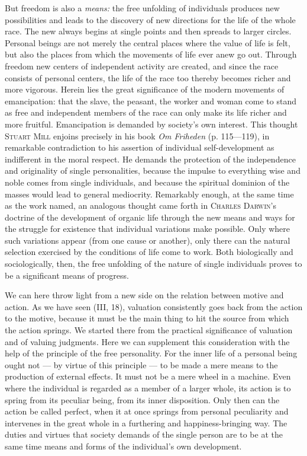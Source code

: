 \documentclass[12pt,a4paper,openany]{book}
\newcommand{\opage}[1]{\marginnote{\footnotesize\textit{[#1]}}}
\begin{document}
But freedom is also a \textit{means:} the free unfolding of individuals produces new possibilities and leads to
the discovery of new directions for the life of the whole race. The new always begins at single points and then
spreads to larger circles. Personal beings are not merely the central places where the value of life is felt,
but also the places from which the movements of life ever anew go out. Through freedom new centers of
independent activity are created, and since the race consists of personal centers, the life of the race too
thereby becomes richer and more vigorous. Herein lies the great significance of the modern movements of
emancipation: that the slave, the peasant, the worker and woman come to stand as free and independent members of
the race can only make its life richer and more fruitful. Emancipation is demanded by society's own interest.
This thought \textsc{Stuart Mill} enjoins precisely in his book \textit{Om Friheden} (p. 115---119), in
remarkable contradiction to his assertion of individual self-development as indifferent in the moral respect.
\opage{177}He demands the protection of the independence and originality of single personalities, because the impulse
to everything wise and noble comes from single individuals, and because the spiritual dominion of the masses
would lead to general mediocrity. Remarkably enough, at the same time as the work named, an analogous thought
came forth in \textsc{Charles Darwin}'s doctrine of the development of organic life through the new means and
ways for the struggle for existence that individual variations make possible. Only where such variations
appear (from one cause or another), only there can the natural selection exercised by the conditions of life
come to work. Both biologically and sociologically, then, the free unfolding of the nature of single individuals
proves to be a significant means of progress.

We can here throw light from a new side on the relation between motive and action. As we have seen (III, 18),
valuation consistently goes back from the action to the motive, because it must be the main thing to hit the
source from which the action springs. We started there from the practical significance of valuation and of
valuing judgments. Here we can supplement this consideration with the help of the principle of the free
personality. For the inner life of a personal being ought not --- by virtue of this principle --- to be made a
mere means to the production of external effects. It must not be a mere wheel in a machine. Even where the
individual is regarded as a member of a larger whole, its action is to spring from its peculiar being, from its
inner disposition. Only then can the action be called perfect, when it at once springs from personal
peculiarity and intervenes in the great whole in a furthering and happiness-bringing way. The duties and virtues
that society demands of the single person are to be at the same time means and forms of the individual's own
development.
\end{document}
